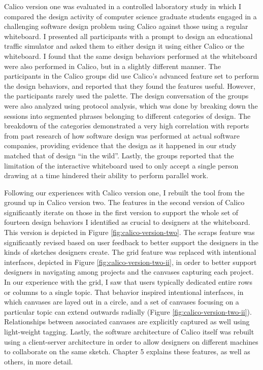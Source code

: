 Calico version one was evaluated in a controlled laboratory study in which I compared the design activity of computer science graduate students engaged in a challenging software design problem using Calico against those using a regular whiteboard. I presented all participants with a prompt to design an educational traffic simulator and asked them to either design it using either Calico or the whiteboard. I found that the same design behaviors performed at the whiteboard were also performed in Calico, but in a slightly different manner. The participants in the Calico groups did use Calico's advanced feature set to perform the design behaviors, and reported that they found the features useful. However, the participants rarely used the palette. The design conversation of the groups were also analyzed using protocol analysis, which was done by breaking down the sessions into segmented phrases belonging to different categories of design. The breakdown of the categories demonstrated a very high correlation with reports from past research of how software design was performed at actual software companies, providing evidence that the design as it happened in our study matched that of design ``in the wild''. Lastly, the groups reported that the limitation of the interactive whiteboard used to only accept a single person drawing at a time hindered their ability to perform parallel work.

Following our experiences with Calico version one, I rebuilt the tool from the ground up in Calico version two. The features in the second version of Calico significantly iterate on those in the first version to support the whole set of fourteen design behaviors I identified as crucial to designers at the whiteboard. This version is depicted in Figure \ref{fig:calico-version-two}. The scraps feature was significantly revised based on user feedback to better support the designers in the kinds of sketches designers create. The grid feature was replaced with intentional interfaces, depicted in Figure \ref{fig:calico-version-two-ii}, in order to better support designers in navigating among projects and the canvases capturing each project. In our experience with the grid, I saw that users typically dedicated entire rows or columns to a single topic. That behavior inspired intentional interfaces, in which canvases are layed out in a circle, and a set of canvases focusing on a particular topic can extend outwards radially (Figure \ref{fig:calico-version-two-ii}). Relationships between associated canvases are explicitly captured as well using light-weight tagging. Lastly, the software architecture of Calico itself was rebuilt using a client-server architecture in order to allow designers on different machines to collaborate on the same sketch. Chapter 5 explains these features, as well as others, in more detail.


